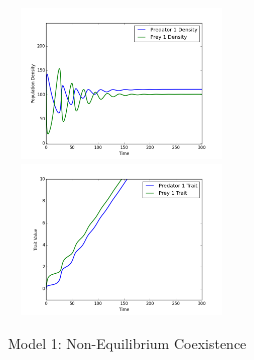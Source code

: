 \documentclass{amsart}
\theoremstyle{definition}
\theoremstyle{remark}
\numberwithin{equation}{section}
\begin{document}
\begin{centering}
\begin{figure}
		\label{fig:constant_growth_coexistence_equilibrium}
	\end{figure}
	\begin{figure}
		\includegraphics[width=6cm,height=4cm]{figures/1x1/constant_growth/densities_unstable_coexistence.png}
		\includegraphics[width=6cm,height=4cm]{figures/1x1/constant_growth/traits_unstable_coexistence.png}
		\caption{Model 1: Non-Equilibrium Coexistence}
		\label{fig:constant_growth_non-equilibrium_coexistence}
	\end{figure}
\end{centering}
\end{document}
